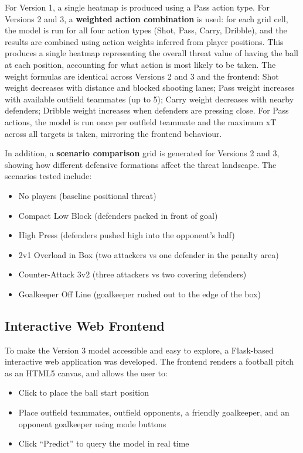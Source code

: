 \documentclass{article}
\begin{document}
For Version 1, a single heatmap is produced using a Pass action type. For Versions 2 and 3, a \textbf{weighted action combination} is used: for each grid cell, the model is run for all four action types (Shot, Pass, Carry, Dribble), and the results are combined using action weights inferred from player positions. This produces a single heatmap representing the overall threat value of having the ball at each position, accounting for what action is most likely to be taken. The weight formulas are identical across Versions 2 and 3 and the frontend: Shot weight decreases with distance and blocked shooting lanes; Pass weight increases with available outfield teammates (up to 5); Carry weight decreases with nearby defenders; Dribble weight increases when defenders are pressing close. For Pass actions, the model is run once per outfield teammate and the maximum xT across all targets is taken, mirroring the frontend behaviour.

In addition, a \textbf{scenario comparison} grid is generated for Versions 2 and 3, showing how different defensive formations affect the threat landscape. The scenarios tested include:
\begin{itemize}
    \item No players (baseline positional threat)
    \item Compact Low Block (defenders packed in front of goal)
    \item High Press (defenders pushed high into the opponent's half)
    \item 2v1 Overload in Box (two attackers vs one defender in the penalty area)
    \item Counter-Attack 3v2 (three attackers vs two covering defenders)
    \item Goalkeeper Off Line (goalkeeper rushed out to the edge of the box)
\end{itemize}

\subsection{Interactive Web Frontend}

To make the Version 3 model accessible and easy to explore, a Flask-based interactive web application was developed. The frontend renders a football pitch as an HTML5 canvas, and allows the user to:

\begin{itemize}
    \item Click to place the ball start position
    \item Place outfield teammates, outfield opponents, a friendly goalkeeper, and an opponent goalkeeper using mode buttons
    \item Click ``Predict'' to query the model in real time
\end{itemize}
\end{document}
